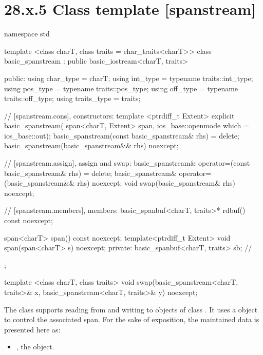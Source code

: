 \documentclass[ebook,11pt,article]{memoir}
\renewcommand{\iref}[1]{[#1]}
\begin{document}
\section{28.x.5 Class template  [spanstream] }

\begin{codeblock}
namespace std {
  template <class charT, class traits = char_traits<charT>>
  class basic_spanstream
    : public basic_iostream<charT, traits> {
  public:
    using char_type      = charT;
    using int_type       = typename traits::int_type;
    using pos_type       = typename traits::pos_type;
    using off_type       = typename traits::off_type;
    using traits_type    = traits;

    // \iref{spanstream.cons}, constructors:
    template <ptrdiff_t Extent>
    explicit basic_spanstream(
      span<charT, Extent> span,
      ios_base::openmode which = ios_base::out);
    basic_spanstream(const basic_spanstream& rhs) = delete;
    basic_spanstream(basic_spanstream&& rhs) noexcept;

    // \iref{spanstream.assign}, assign and swap:
    basic_spanstream& operator=(const basic_spanstream& rhs) = delete;
    basic_spanstream& operator=(basic_spanstream&& rhs) noexcept;
    void swap(basic_spanstream& rhs) noexcept;

    // \iref{spanstream.members}, members:
    basic_spanbuf<charT, traits>* rdbuf() const noexcept;

    span<charT> span() const noexcept;
	template<ptrdiff_t Extent>
    void span(span<charT> s) noexcept;
  private:
    basic_spanbuf<charT, traits> sb; // \expos
  };

  template <class charT, class traits>
    void swap(basic_spanstream<charT, traits>& x,
              basic_spanstream<charT, traits>& y) noexcept;
}
\end{codeblock}

\pnum
The class
supports reading from and writing to objects of class
.
It uses a
object to control the associated span.
For the sake of exposition, the maintained data is presented here as:
\begin{itemize}
\item
{}, the  object.
\end{itemize}
\end{document}
